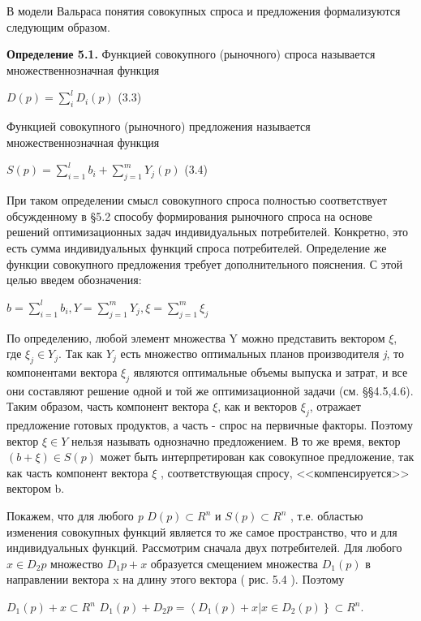 \documentclass[12pt, 4paper]{book}
\begin{document}
{В модели Вальраса понятия совокупных спроса и предложения формализуются следующим образом.
\par

\textbf{Определение 5.1.} Функцией совокупного (рыночного) спроса называется множественнозначная функция
\begin{center}
$D(p)=\sum\limits_{i}^{l}D_i(p)$ (3.3)
\end{center}
\par

Функцией совокупного (рыночного) предложения называется множественнозначная функция
\begin{center}
$S(p)=\sum\limits_{i=1}^{l}b_i+\sum\limits_{j=1}^{m}Y_j(p)$ (3.4)
\end{center}
\par

При таком определении смысл совокупного спроса полностью соответствует обсужденному в §5.2  способу формирования рыночного спроса на основе решений оптимизационных задач индивидуальных потребителей. Конкретно, это есть сумма индивидуальных функций спроса потребителей. Определение же функции совокупного предложения требует дополнительного пояснения. С этой целью введем обозначения:
\par

\begin{center}
$b=\sum\limits_{i=1}^{l}b_i,Y=\sum\limits_{j=1}^{m} Y_j,\xi = \sum\limits_{j=1}^{m}\xi_j$
\end{center}
\par

По определению, любой элемент множества Y можно представить вектором $\xi$, где $\xi_j \in Y_j$. Так как $Y_j$ есть множество оптимальных планов производителя \textit{j}, то компонентами вектора $\xi_j$ являются оптимальные объемы выпуска и затрат, и все они составляют решение одной и той же оптимизационной задачи (см. §§4.5,4.6). Таким образом, часть компонент вектора $\xi$, как и векторов $\xi_j$, отражает предложение готовых продуктов, а часть - спрос на первичные факторы. Поэтому вектор $\xi \in Y$ нельзя называть однозначно предложением. В то же время, вектор $(b + \xi) \in S(p)$ может быть интерпретирован как совокупное предложение, так как часть компонент вектора $\xi$ , соответствующая спросу, <<компенсируется>> вектором b.
\par

Покажем, что для любого \textit{p} $D(p) \subset R^n$ и $S(p) \subset R^n$ , т.е. областью изменения совокупных функций является то же самое пространство, что и для индивидуальных функций. Рассмотрим сначала двух потребителей. Для любого $x \in D_2{p}$ множество $D_1{p}+x$ образуется смещением множества $D_1(p)$ в направлении вектора x на длину этого вектора ( рис. 5.4 ). Поэтому
\begin{center}
$D_1(p)+x \subset R^n$
$D_1(p)+D_2{p}=\left\langle D_1(p)+x|x \in D_2(p)\right\} \subset R^n.$
\end{center}
\par

}
\end{document}
